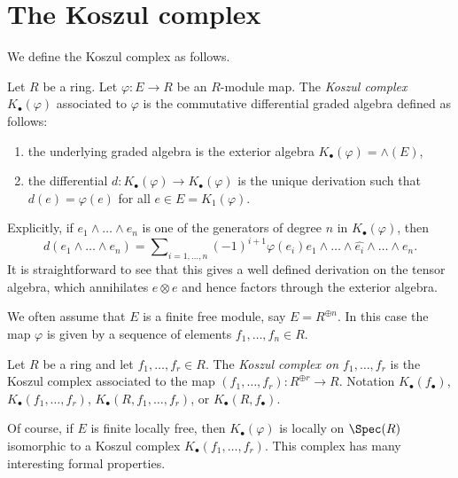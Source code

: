 \section{The Koszul complex}
\label{section-koszul}

\noindent
We define the Koszul complex as follows.

\begin{definition}
\label{definition-koszul}
Let $R$ be a ring. Let $\varphi : E \to R$ be an $R$-module map. The
{\it Koszul complex} $K_\bullet(\varphi)$ associated to $\varphi$
is the commutative differential graded algebra defined as follows:
\begin{enumerate}
\item the underlying graded algebra is the exterior algebra
$K_\bullet(\varphi) = \wedge(E)$,
\item the differential $d : K_\bullet(\varphi) \to K_\bullet(\varphi)$
is the unique derivation such that $d(e) = \varphi(e)$ for all
$e \in E = K_1(\varphi)$.
\end{enumerate}
\end{definition}

\noindent
Explicitly, if $e_1 \wedge \ldots \wedge e_n$ is one of the generators of
degree $n$ in $K_\bullet(\varphi)$, then
$$
d(e_1 \wedge \ldots \wedge e_n) =
\sum\nolimits_{i = 1, \ldots, n} (-1)^{i + 1}
\varphi(e_i)e_1 \wedge \ldots \wedge \widehat{e_i} \wedge \ldots \wedge e_n.
$$
It is straightforward to see that this gives a well defined derivation
on the tensor algebra, which annihilates $e \otimes e$ and hence factors
through the exterior algebra.

\medskip\noindent
We often assume that $E$ is a finite free module, say $E = R^{\oplus n}$.
In this case the map $\varphi$ is given by a sequence of elements
$f_1, \ldots, f_n \in R$.

\begin{definition}
\label{definition-koszul-complex}
Let $R$ be a ring and let $f_1, \ldots, f_r \in R$. The
{\it Koszul complex on $f_1, \ldots, f_r$} is the Koszul complex
associated to the map $(f_1, \ldots, f_r) : R^{\oplus r} \to R$.
Notation $K_\bullet(f_\bullet)$, $K_\bullet(f_1, \ldots, f_r)$,
$K_\bullet(R, f_1, \ldots, f_r)$, or $K_\bullet(R, f_\bullet)$.
\end{definition}

\noindent
Of course, if $E$ is finite locally free, then $K_\bullet(\varphi)$ is
locally on $\Spec(R)$ isomorphic to a Koszul complex
$K_\bullet(f_1, \ldots, f_r)$.
This complex has many interesting formal properties.

